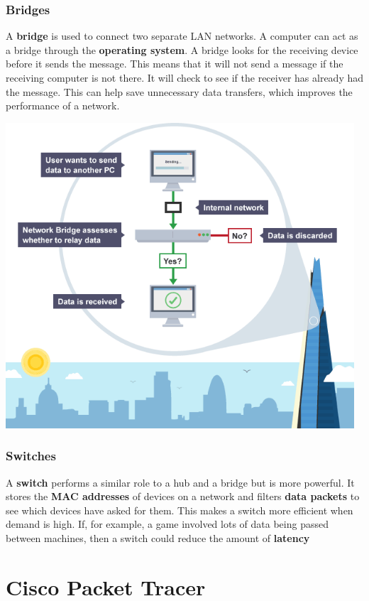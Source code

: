 \documentclass[a4paper,12pt]{article}
\begin{document}
\subsubsection{Bridges}
A \textbf{bridge} is used to connect two separate LAN networks. A computer can act as a bridge through the \textbf{operating system}. A bridge looks for the receiving device before it sends the message. This means that it will not send a message if the receiving computer is not there. It will check to see if the receiver has already had the message. This can help save unnecessary data transfers, which improves the performance of a network.

\includegraphics[width=13cm]{./performance.PNG}

\subsubsection{Switches}
A \textbf{switch} performs a similar role to a hub and a bridge but is more powerful. It stores the \textbf{MAC addresses} of devices on a network and filters \textbf{data packets} to see which devices have asked for them. This makes a switch more efficient when demand is high. If, for example, a game involved lots of data being passed between machines, then a switch could reduce the amount of \textbf{latency}

\section{Cisco Packet Tracer}
\end{document}
